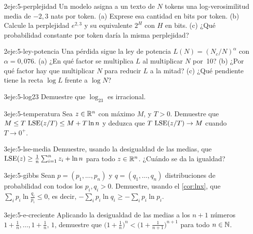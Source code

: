 \begin{ejercicio}{2}{eje:5-perplejidad}
Un modelo asigna a un texto de $N$ tokens una log-verosimilitud media de $-2{,}3$ nats por token. (a) Exprese esa cantidad en bits por token. (b) Calcule la perplejidad $e^{2{,}3}$ y su equivalente $2^{H}$ con $H$ en bits. (c) ¿Qué probabilidad constante por token daría la misma perplejidad?
\end{ejercicio}

\begin{ejercicio}{2}{eje:5-ley-potencia}
Una pérdida sigue la ley de potencia $L(N)=(N_c/N)^{\alpha}$ con $\alpha=0{,}076$. (a) ¿En qué factor se multiplica $L$ al multiplicar $N$ por~10? (b) ¿Por qué factor hay que multiplicar $N$ para reducir $L$ a la mitad? (c) ¿Qué pendiente tiene la recta $\log L$ frente a $\log N$?
\end{ejercicio}

\begin{ejercicio}{3}{eje:5-log23}
Demuestre que $\log_23$ es irracional.
\end{ejercicio}

\begin{ejercicio}{3}{eje:5-temperatura}
Sea $z\in\mathbb{R}^n$ con máximo $M$, y $T>0$. Demuestre que $M\le T\,\operatorname{LSE}(z/T)\le M+T\ln n$ y deduzca que $T\,\operatorname{LSE}(z/T)\to M$ cuando $T\to0^{+}$.
\end{ejercicio}

\begin{ejercicio}{3}{eje:5-lse-media}
Demuestre, usando la desigualdad de las medias, que $\operatorname{LSE}(z)\ge\frac1n\sum_{i=1}^nz_i+\ln n$ para todo $z\in\mathbb{R}^n$. ¿Cuándo se da la igualdad?
\end{ejercicio}

\begin{ejercicio}{3}{eje:5-gibbs}
Sean $p=(p_1,\dots,p_n)$ y $q=(q_1,\dots,q_n)$ distribuciones de probabilidad con todos los $p_i,q_i>0$. Demuestre, usando el \cref{cor:lnx}, que $\sum_ip_i\ln\frac{q_i}{p_i}\le0$, es decir, $-\sum_ip_i\ln q_i\ge-\sum_ip_i\ln p_i$.
\end{ejercicio}

\begin{ejercicio}{3}{eje:5-e-creciente}
Aplicando la desigualdad de las medias a los $n+1$ números $1+\frac1n,\dots,1+\frac1n,\,1$, demuestre que $\bigl(1+\frac1n\bigr)^n<\bigl(1+\frac1{n+1}\bigr)^{n+1}$ para todo $n\in\mathbb{N}$.
\end{ejercicio}
